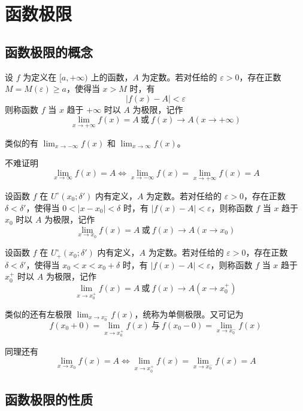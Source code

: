 \chapter{函数极限}

\section{函数极限的概念}

\begin{definition}
    设 $f$ 为定义在 $[a,+\infty)$ 上的函数，$A$ 为定数。若对任给的 $\varepsilon>0$，存在正数 $M=M(\varepsilon) \geqslant a$，使得当 $x>M$ 时，有
    $$|f(x)-A| < \varepsilon$$
    则称函数 $f$ 当 $x$ 趋于 $+\infty$ 时以 $A$ 为极限，记作
    $$\lim_{x\to +\infty}f(x) = A\ \text{或}\ f(x) \to A(x\to +\infty)$$
\end{definition}

类似的有 $\displaystyle\lim_{x\to -\infty}f(x)$ 和 $\displaystyle\lim_{x\to \infty}f(x)$。

不难证明
$$\lim_{x \to \infty}f(x) = A \Leftrightarrow \lim_{x \to -\infty}f(x)=\lim_{x \to +\infty}f(x)=A$$

\begin{definition}
    设函数 $f$ 在 $U^\circ(x_0;\delta')$ 内有定义，$A$ 为定数。若对任给的 $\varepsilon>0$，存在正数 $\delta<\delta'$，使得当 $0<|x-x_0|<\delta$ 时，有 $|f(x)-A|<\varepsilon$，则称函数 $f$ 当 $x$ 趋于 $x_0$ 时以 $A$ 为极限，记作
    $$\lim_{x\to x_0}f(x) = A\ \text{或}\ f(x)\to A(x\to x_0)$$
\end{definition}

\begin{definition}
    设函数 $f$ 在 $U_+^\circ(x_0;\delta')$ 内有定义，$A$ 为定数。若对任给的 $\varepsilon>0$，存在正数 $\delta<\delta'$，使得当 $x_0<x<x_0+\delta$ 时，有 $|f(x)-A|<\varepsilon$，则称函数 $f$ 当 $x$ 趋于 $x_0^+$ 时以 $A$ 为极限，记作 
    $$\lim_{x\to x_0^+}f(x) = A\ \text{或}\ f(x)\to A(x\to x_0^+)$$
\end{definition}

类似的还有左极限 $\displaystyle\lim_{x\to x_0^-}f(x)$，统称为单侧极限。又可记为
$$f(x_0+0) = \lim_{x\to x_0^+}f(x)\ \text{与}\ f(x_0-0) = \lim_{x\to x_0^-}f(x)$$

同理还有
$$\lim_{x \to x_0}f(x) = A \Leftrightarrow \lim_{x \to x_0^+}f(x)=\lim_{x \to x_0^-}f(x)=A$$

\section{函数极限的性质}

